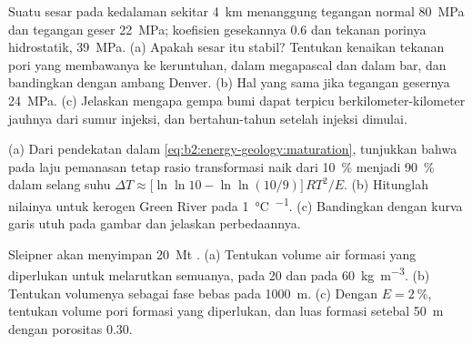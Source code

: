 \begin{exercise}[$\star\star\star$]\label{exo:b2:energy-geology:10}
Suatu sesar pada kedalaman sekitar \qty{4}{km} menanggung tegangan normal \qty{80}{MPa} dan tegangan geser
\qty{22}{MPa}; koefisien gesekannya 0.6 dan tekanan porinya hidrostatik,
\qty{39}{MPa}. (a) Apakah sesar itu stabil? Tentukan kenaikan tekanan pori yang membawanya ke keruntuhan, dalam
megapascal dan dalam bar, dan bandingkan dengan ambang Denver. (b) Hal yang sama jika tegangan gesernya
\qty{24}{MPa}. (c) Jelaskan mengapa gempa bumi dapat terpicu berkilometer-kilometer jauhnya dari sumur injeksi,
dan bertahun-tahun setelah injeksi dimulai.
\end{exercise}

\begin{exercise}[$\star\star\star$]\label{exo:b2:energy-geology:11}
(a) Dari pendekatan dalam \eqref{eq:b2:energy-geology:maturation}, tunjukkan bahwa pada laju
pemanasan tetap rasio transformasi naik dari \qty{10}{\percent} menjadi \qty{90}{\percent} dalam selang
suhu $\Delta T \approx \bigl[\ln\ln 10 - \ln\ln(10/9)\bigr]\,RT^2/E$. (b) Hitunglah nilainya
untuk kerogen Green River pada \qty{1}{\celsius\per\Ma}. (c) Bandingkan dengan kurva garis utuh pada
gambar dan jelaskan perbedaannya.
\end{exercise}

\begin{exercise}[$\star\star\star$]\label{exo:b2:energy-geology:12}
Sleipner akan menyimpan \qty{20}{Mt} . (a) Tentukan volume air formasi yang diperlukan untuk
melarutkan semuanya, pada 20 dan pada \qty{60}{kg.m^{-3}}. (b) Tentukan volumenya sebagai fase bebas pada
\qty{1000}{m}. (c) Dengan $E = \qty{2}{\percent}$, tentukan volume pori formasi yang diperlukan, dan
luas formasi setebal \qty{50}{m} dengan porositas 0.30.
\end{exercise}

